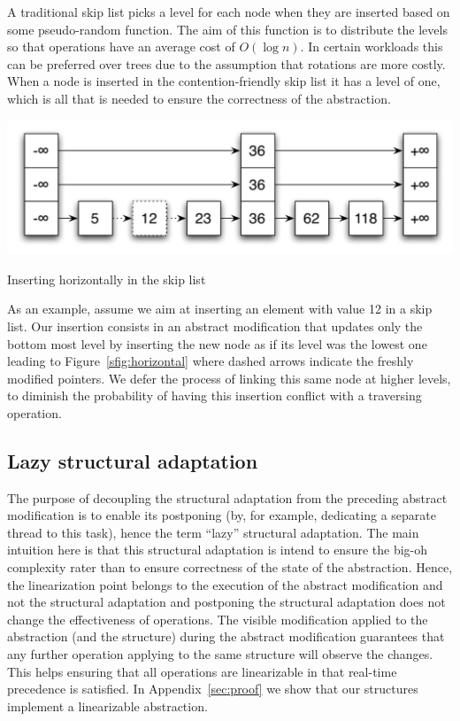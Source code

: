 A traditional skip list picks a level for each node when they are
inserted based on some pseudo-random function.  The aim of this function
is to distribute the levels so that operations have an average cost of
$O(\log{n})$.  In certain workloads this can be preferred over trees due
to the assumption that rotations are more costly. 
When a node is inserted in
the contention-friendly skip list it has a level of one, which is all that is needed to ensure the correctness of the abstraction.

\begin{floatingfigure}{7.5cm}
\includegraphics[scale=0.35]{CF-general/fig/horizontal-insert}
\caption{\footnotesize{Inserting horizontally in the skip list\label{sfig:horizontal}}}
\end{floatingfigure}

As an example, assume we aim at inserting an element with value 12 in a skip list.  Our 
insertion consists in an abstract modification that updates only the bottom most level by inserting the new 
node as if its level was the lowest one leading to Figure~\ref{sfig:horizontal} where dashed arrows indicate the freshly modified pointers.
We defer the process of linking this same node at higher levels, to diminish 
the probability of having this insertion conflict with a traversing operation.

\subsection{Lazy structural adaptation}

The purpose of decoupling the structural adaptation from the preceding abstract modification is to enable its postponing (by, for example, dedicating a separate thread to this task), hence the term ``lazy'' structural adaptation.
The main intuition here is that this structural adaptation is intend to ensure the big-oh complexity rater 
than to ensure correctness of the state of the abstraction.
Hence, the linearization point belongs to the execution of the abstract modification and not the structural 
adaptation and postponing the structural adaptation does not change the effectiveness of operations.
The visible modification applied to the abstraction (and the structure) during the abstract modification guarantees that any further operation applying to the same structure will observe the changes. This helps ensuring that all operations are linearizable in that real-time precedence is 
satisfied. In Appendix~\ref{sec:proof} we show that our structures implement a linearizable abstraction. 

